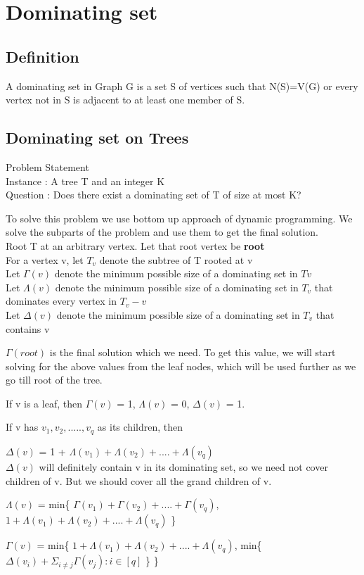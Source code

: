 \section{Dominating set}

\subsection{Definition}
A dominating set in Graph G is a set S of vertices such that N(S)=V(G)
or every vertex not in S is adjacent to at least one member of S.

\subsection{Dominating set on Trees}
Problem Statement \\
Instance : A tree T and an integer K \\
Question : Does there exist a dominating set of T of size at most K?

To solve this problem we use bottom up approach of dynamic programming.
We solve the subparts of the problem and use them to get the final solution.\\
Root T at an arbitrary vertex. Let that root vertex be \textbf{root} \\
For a vertex v, let $T_v$ denote the subtree of T rooted at v \\ 
Let $\Gamma(v)$ denote the minimum possible size of a dominating set in $Tv$ \\
Let $\Lambda(v)$ denote the minimum possible size of a dominating set in $T_v$ 
that dominates every vertex in $T_v-v$ \\
Let $\Delta(v)$ denote the minimum possible size of a dominating set in $T_v$ that 
contains v

$\Gamma(root)$ is the final solution which we need. To get this value, we will start
solving for the above values from the leaf nodes, which will be used further as we 
go till root of the tree. 

If v is a leaf, then 
$\Gamma(v)$ = 1,
$\Lambda(v)$ = 0,
$\Delta(v)$ = 1.


If v has $v_1, v_2, ....., v_q$ as its children, then 

$\Delta(v)$ = 1 + $\Lambda(v_1)+\Lambda(v_2)+....+\Lambda(v_q)$\\
$\Delta(v)$ will definitely contain v in its dominating set, so we need not cover children of v. 
But we should cover all the grand children of v.

$\Lambda(v)$ = min\{ $\Gamma(v_1) + \Gamma(v_2) + .... + \Gamma(v_q)$,  
$1 + \Lambda(v_1)+\Lambda(v_2)+....+\Lambda(v_q)$ \}

$\Gamma(v)$ = min\{ $1 + \Lambda(v_1)+\Lambda(v_2)+....+\Lambda(v_q)$,
min\{$\Delta(v_i) + \Sigma_{i \neq j} \Gamma(v_j) : i \in [q] $ \} \}


